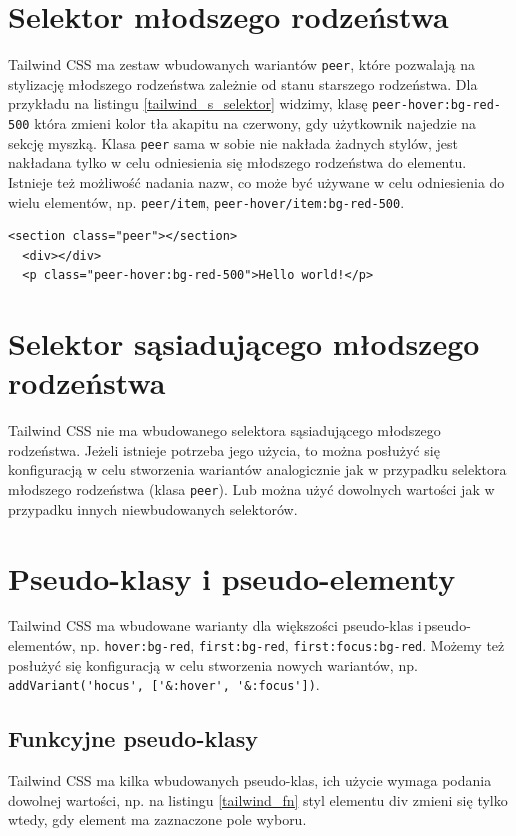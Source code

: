 \documentclass[a4paper,12pt]{book} %
\begin{document}
\section{Selektor młodszego rodzeństwa}
Tailwind CSS ma zestaw wbudowanych wariantów \lstinline|peer|, które pozwalają na stylizację młodszego rodzeństwa zależnie od stanu starszego rodzeństwa. Dla przykładu na listingu \ref{tailwind_s_selektor} widzimy, klasę \lstinline|peer-hover:bg-red-500| która zmieni kolor tła akapitu na czerwony, gdy użytkownik najedzie na sekcję myszką. Klasa \lstinline|peer| sama w sobie nie nakłada żadnych stylów, jest nakładana tylko w celu odniesienia się młodszego rodzeństwa do elementu. Istnieje też możliwość nadania nazw, co może być używane w celu odniesienia do wielu elementów, np. \lstinline|peer/item|, \lstinline|peer-hover/item:bg-red-500|.

\begin{lstfloat}[hb]
  \lstset{language=HTML}
  \begin{lstlisting}[frame=single]
  <section class="peer"></section>
  <div></div>
  <p class="peer-hover:bg-red-500">Hello world!</p>
\end{lstlisting}
  \caption{Przykład wykorzystania klasy \lstinline|peer|}\label{tailwind_s_selektor}
\end{lstfloat}

\section{Selektor sąsiadującego młodszego rodzeństwa}
Tailwind CSS nie ma wbudowanego selektora sąsiadującego młodszego rodzeństwa. Jeżeli istnieje potrzeba jego użycia, to można posłużyć się konfiguracją w celu stworzenia wariantów analogicznie jak w przypadku selektora młodszego rodzeństwa (klasa \lstinline|peer|). Lub można użyć dowolnych wartości jak w przypadku innych niewbudowanych selektorów.

\section{Pseudo-klasy i pseudo-elementy}
Tailwind CSS ma wbudowane warianty dla większości pseudo-klas i\,pseudo-elementów, np. \lstinline|hover:bg-red|, \lstinline|first:bg-red|, \lstinline|first:focus:bg-red|. Możemy też posłużyć się konfiguracją w celu stworzenia nowych wariantów, np. \lstinline|addVariant('hocus', ['&:hover', '&:focus'])|.
\subsection{Funkcyjne pseudo-klasy}
Tailwind CSS ma kilka wbudowanych pseudo-klas, ich użycie wymaga podania dowolnej wartości, np. na listingu \ref{tailwind_fn} styl elementu div zmieni się tylko wtedy, gdy element ma zaznaczone pole wyboru.
\end{document}
